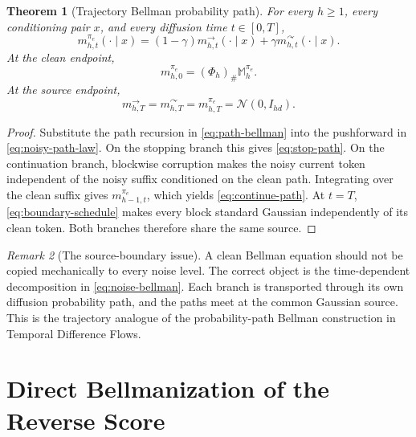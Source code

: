\documentclass[11pt]{article}
\newtheorem{theorem}{Theorem}
\theoremstyle{definition}
\theoremstyle{remark}
\newtheorem{remark}[theorem]{Remark}
\newcommand{\Normal}{\mathcal N}
\newcommand{\targetpi}{\pi_e}
\newcommand{\branchstop}{\rightarrow}
\newcommand{\branchcont}{\curvearrowright}
\begin{document}
\begin{theorem}[Trajectory Bellman probability path]
\label{thm:path-mixture}
For every $h\geq 1$, every conditioning pair $x$, and every diffusion time
$t\in[0,T]$,
\begin{equation}
\boxed{
 m_{h,t}^{\targetpi}(\cdot\mid x)
 =
 (1-\gamma)
 m_{h,t}^{\branchstop}(\cdot\mid x)
 +
 \gamma
 m_{h,t}^{\branchcont}(\cdot\mid x).
}
\label{eq:noise-bellman}
\end{equation}
At the clean endpoint,
\begin{equation}
m_{h,0}^{\targetpi}
=
(\Phi_h)_{\#}\mathbb M_h^{\targetpi}.
\label{eq:clean-endpoint}
\end{equation}
At the source endpoint,
\begin{equation}
m_{h,T}^{\branchstop}
=
m_{h,T}^{\branchcont}
=
m_{h,T}^{\targetpi}
=
\Normal(0,I_{hd}).
\label{eq:common-source}
\end{equation}
\end{theorem}

\begin{proof}
Substitute the path recursion in \cref{eq:path-bellman} into the pushforward
in \cref{eq:noisy-path-law}. On the stopping branch this gives
\cref{eq:stop-path}. On the continuation branch, blockwise corruption makes
the noisy current token independent of the noisy suffix conditioned on the
clean path. Integrating over the clean suffix gives
$m_{h-1,t}^{\targetpi}$, which yields \cref{eq:continue-path}. At $t=T$,
\cref{eq:boundary-schedule} makes every block standard Gaussian independently
of its clean token. Both branches therefore share the same source.
\end{proof}

\begin{remark}[The source-boundary issue]
A clean Bellman equation should not be copied mechanically to every noise
level. The correct object is the time-dependent decomposition in
\cref{eq:noise-bellman}. Each branch is transported through its own diffusion
probability path, and the paths meet at the common Gaussian source. This is the
trajectory analogue of the probability-path Bellman construction in Temporal
Difference Flows.
\end{remark}

\section{Direct Bellmanization of the Reverse Score}
\label{sec:score-learning}
\end{document}
